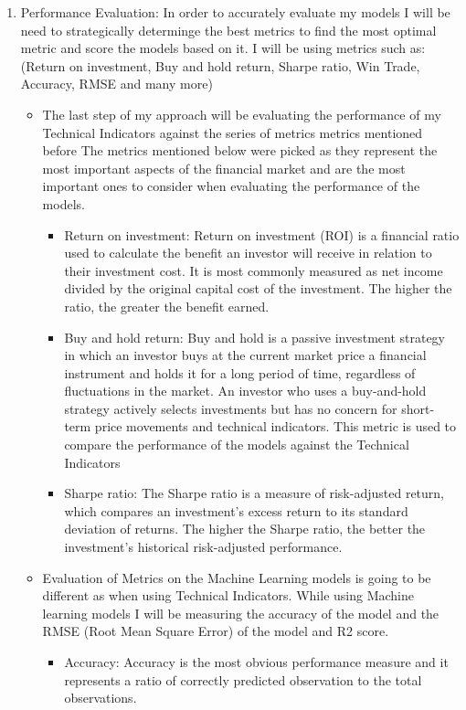 \documentclass{imc-inf}
\begin{document}
\begin{enumerate}
\begin{itemize}
		\end{itemize}
	\item Performance Evaluation: In order to accurately evaluate my models I will be need to strategically determinge the best
	metrics to find the most optimal metric and score the models based on it. I will be using metrics such as:
	(Return on investment, Buy and hold return, Sharpe ratio, Win Trade, Accuracy, RMSE and many more)
		\begin{itemize}
		\item  The last step of my approach will be evaluating the performance of my Technical Indicators against the series of metrics 
		metrics mentioned before
		The metrics mentioned below were picked as they represent the most important aspects of the financial market and are the most important
		ones to consider when evaluating the performance of the models.
			\begin{itemize}
				\item Return on investment: Return on investment (ROI) is a financial ratio used to calculate the benefit an investor will receive in relation to their investment cost.
				 It is most commonly measured as net income divided by the original capital cost of the investment. The higher the ratio, the greater the benefit earned.
				\item Buy and hold return: Buy and hold is a passive investment strategy in which an investor buys at the current market price a financial 
				instrument and holds it for a long period of time, regardless of fluctuations in the market. An investor who uses a
				buy-and-hold strategy actively selects investments but has no concern for short-term price movements and 
				technical indicators. This metric is used to compare the performance of the models against the Technical Indicators
				\item Sharpe ratio: The Sharpe ratio is a measure of risk-adjusted return, which compares an investment's excess return to its standard deviation of returns.
				The higher the Sharpe ratio, the better the investment's historical risk-adjusted performance.
			\end{itemize}
		\item Evaluation of Metrics on the Machine Learning models is going to be different as when using Technical Indicators. 
		While using Machine learning models I will be measuring the accuracy of the model and the RMSE (Root Mean Square Error) of the model and R2 score.
			\begin{itemize}
				\item Accuracy: Accuracy is the most obvious performance measure and it represents a ratio of correctly predicted observation to the total observations.

\end{itemize}
\end{itemize}
\end{enumerate}
\end{document}
